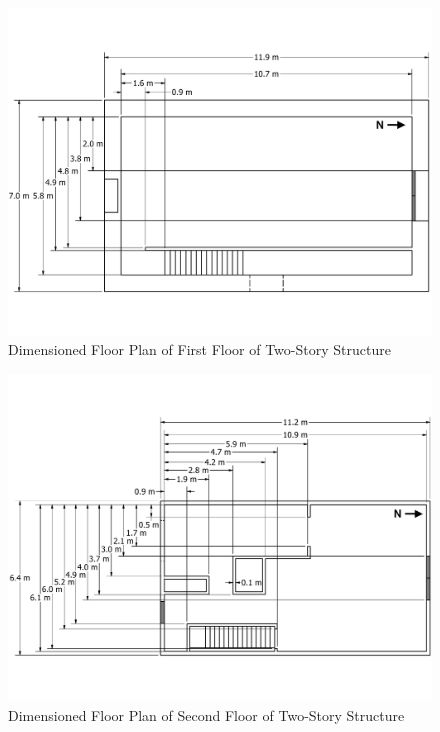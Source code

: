 \documentclass[12pt,oneside]{book}
\begin{document}
\begin{figure}[!ht]
	\includegraphics[width=\columnwidth]{../../DelCo_2014_2015/Drawings/PDFs/CAFS/West_Structure_1st_Floor_Plain}
	\caption{Dimensioned Floor Plan of First Floor of Two-Story Structure}
	\label{fig:dimensioned_first_2story}
\end{figure}


\begin{figure}[!ht]
	\includegraphics[width=\columnwidth]{../../DelCo_2014_2015/Drawings/PDFs/CAFS/West_Structure_2nd_Floor_Plain}
	\caption{Dimensioned Floor Plan of Second Floor of Two-Story Structure}
	\label{fig:dimensioned_second_2story}
\end{figure}
\end{document}
